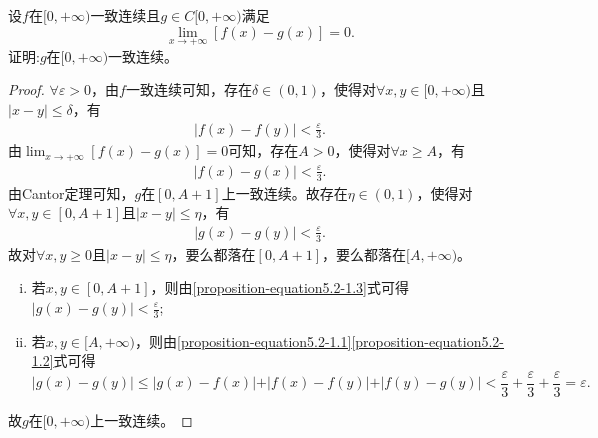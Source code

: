 \documentclass[../../main.tex]{subfiles}
\begin{document}
\begin{proposition}\label{proposition:连续函数在无穷远处与一致连续极限相同则一定也一致连续}
设\(f\)在\([0,+\infty)\)一致连续且\(g\in C[0,+\infty)\)满足
\[
\lim_{x\rightarrow +\infty}[f(x)-g(x)] = 0.
\]
证明:\(g\)在\([0,+\infty)\)一致连续。
\end{proposition}
\begin{proof}
\(\forall \varepsilon > 0\)，由\(f\)一致连续可知，存在\(\delta \in (0, 1)\)，使得对\(\forall x, y \in [0, +\infty)\)且\(\vert x - y \vert \leqslant  \delta\)，有
\begin{align}\label{proposition-equation5.2-1.1}
\vert f(x) - f(y) \vert < \frac{\varepsilon}{3}. 
\end{align}
由\(\lim_{x \to +\infty}[f(x) - g(x)] = 0\)可知，存在\(A > 0\)，使得对\(\forall x \geqslant  A\)，有
\begin{align}\label{proposition-equation5.2-1.2}
\vert f(x) - g(x) \vert < \frac{\varepsilon}{3}.  
\end{align}
由Cantor定理可知，\(g\)在\([0, A + 1]\)上一致连续。故存在\(\eta \in (0, 1)\)，使得对\(\forall x, y \in [0, A + 1]\)且\(\vert x - y \vert \leqslant  \eta\)，有
\begin{align}\label{proposition-equation5.2-1.3}
\vert g(x) - g(y) \vert < \frac{\varepsilon}{3}. 
\end{align}
故对\(\forall x, y \geqslant  0\)且\(\vert x - y \vert \leqslant  \eta\)，要么都落在\([0, A + 1]\)，要么都落在\([A, +\infty)\)。
\begin{enumerate}[(i)]
\item 若\(x, y \in [0, A + 1]\)，则由\eqref{proposition-equation5.2-1.3}式可得\(\vert g(x) - g(y) \vert < \frac{\varepsilon}{3}\);
\item 若\(x, y \in [A, +\infty)\)，则由\eqref{proposition-equation5.2-1.1}\eqref{proposition-equation5.2-1.2}式可得
\[
\vert g(x) - g(y) \vert \leqslant  \vert g(x) - f(x) \vert + \vert f(x) - f(y) \vert + \vert f(y) - g(y) \vert < \frac{\varepsilon}{3} + \frac{\varepsilon}{3} + \frac{\varepsilon}{3} = \varepsilon.
\]
\end{enumerate}
故\(g\)在\([0, +\infty)\)上一致连续。
\end{proof}
\end{document}
